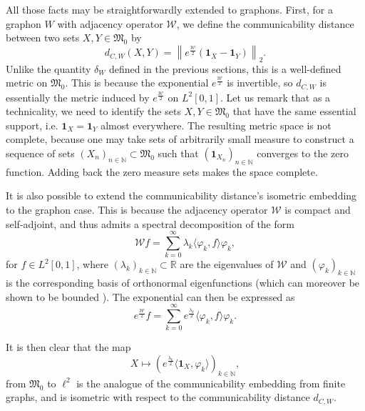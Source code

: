 \documentclass[11pt]{article}
\def\N{\mathbb{N}}
\def\R{\mathbb{R}}
\def\II{\bm{1}}
\def\calW{\mathcal{W}}
\def\frakM{\mathfrak{M}_0}
\theoremstyle{definition}
\begin{document}
All those facts may be straightforwardly extended to graphons. First, for a graphon $W$ with adjacency operator $\calW$, we define the communicability distance between two sets $X,Y \in \frakM$ by
\begin{equation} \label{eq:communicability}
    d_{C,W} (X,Y) = \left\| e^{\frac{\calW}{2}} (\II_X - \II_Y) \right\|_2. 
\end{equation} 
Unlike the quantity $\delta_W$ defined in the previous sections, this is a well-defined metric on $\frakM$. This is because the exponential $e^{\frac{\calW}{2}}$ is invertible, so $d_{C,W}$ is essentially the metric induced by $e^{\frac{\calW}{2}}$ on $L^2 [0,1]$. Let us remark that as a technicality, we need to identify the sets $X,Y \in \frakM$ that have the same essential support, i.e. $\II_X = \II_Y$ almost everywhere. The resulting metric space is not complete, because one may take sets of arbitrarily small measure to construct a sequence of sets $(X_n)_{n\in\N} \subset \frakM$ such that $(\II_{X_n})_{n\in\N}$ converges to the zero function. Adding back the zero measure sets makes the space complete.

It is also possible to extend the communicability distance's isometric embedding to the graphon case. This is because the adjacency operator $\calW$ is compact and self-adjoint, and thus admits a spectral decomposition of the form
\begin{equation} \label{eq:adjacency-eigen} 
    \calW f = \sum_{k=0}^\infty \lambda_k \langle \varphi_k, f \rangle \varphi_k,
\end{equation}
for $f\in L^2 [0,1]$, where $(\lambda_k)_{k\in\N} \subset \R$ are the eigenvalues of $\calW$ and $(\varphi_k)_{k\in\N}$ is the corresponding basis of orthonormal eigenfunctions (which can moreover be shown to be bounded \cite{lovaszGraphon2012}). The exponential can then be expressed as
\begin{equation} \label{eq:communicability-eigen} 
    e^{\frac{\calW}{2}} f = \sum_{k=0}^\infty e^{\frac{\lambda_k}{2}} \langle \varphi_k, f \rangle \varphi_k.
\end{equation}

It is then clear that the map
$$ X \mapsto (e^{\frac{\lambda_k}{2}} \langle \II_X, \varphi_k \rangle )_{k\in\N}, $$
from $\frakM$ to $\ell^2$ is the analogue of the communicability embedding from finite graphs, and is isometric with respect to the communicability distance $d_{C,W}$.
\end{document}
